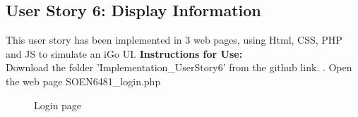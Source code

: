 \documentclass[12pt]{report}
\begin{document}
\FloatBarrier
\subsection{User Story 6: Display Information}
This user story has been implemented in 3 web pages, using Html, CSS, PHP and JS to simulate an iGo UI.
\newline
\textbf{Instructions for Use:}\\
Download the folder 'Implementation\_UserStory6' from the github link.
.	Open the web page SOEN6481\_login.php
\begin{figure}[H]
	\caption{\label{fig:6_login}Login page}	
\end{figure}
\end{document}
